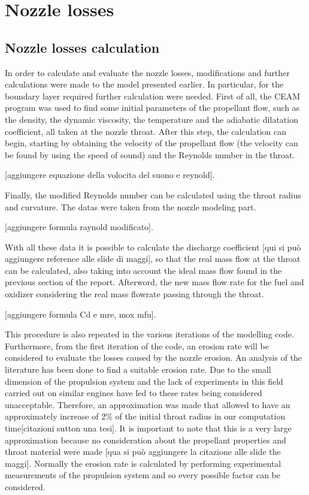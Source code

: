 \section{Nozzle losses}
\label{sec:nozzle_losses}

\subsection{Nozzle losses calculation}  

In order to calculate and evaluate the nozzle losses, modifications and further calculations were made to the model presented earlier. In particular, for the boundary layer required further calculation were needed. First of all, the CEAM program was used to find some initial parameters of the propellant flow, such as the density, the dynamic viscosity, the temperature and the adiabatic dilatation coefficient, all taken at the nozzle throat. After this step, the calculation can begin, starting by obtaining the velocity of the propellant flow (the velocity can be found by using the speed of sound) and the Reynolds number in the throat.   

[aggiungere equazione della volocita del suono e reynold].    

Finally, the modified Reynolds number can be calculated using the throat radius and curvature. The datas were taken from the nozzle modeling part.  

[aggiungere formula raynold modificato].  

With all these data it is possible to calculate the discharge coefficient [qui si può aggiungere reference alle slide di maggi], so that the real mass flow at the throat can be calculated, also taking into account the ideal mass flow found in the previous section of the report. Afterword, the new mass flow rate for the fuel and oxidizer considering the real mass flowrate passing through the throat.  

[aggiungere formula Cd e mre, mox mfu].    

This procedure is also repeated in the various iterations of the modelling code. Furthermore, from the first iteration of the code, an erosion rate will be considered to evaluate the losses caused by the nozzle erosion. An analysis of the literature has been done to find a suitable erosion rate. Due to the small dimension of the propulsion system and the lack of experiments in this field carried out on similar engines have led to these rates being considered unacceptable. Therefore, an approximation was made that allowed to have an approximately increase of 2\% of the initial throat radius in our computation time[citazioni sutton una tesi]. It is important to note that this is a very large approximation because no consideration about the propellant properties and throat material were made [qua si può aggiungere la citazione alle slide the maggi]. Normally the erosion rate is calculated by performing experimental measurements of the propulsion system and so every possible factor can be considered.   

